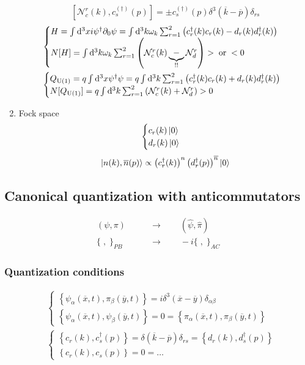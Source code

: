 \begin{example}
\begin{enumerate}
\[ \left[\mathcal{N}_c^{r}(k), c_s^{(\dagger)}(p)\right] = \pm c_s^{(\dagger)}(p)\delta^3(\overline{k}- \overline{p})\delta_{rs} \]
\begin{align*}
& \begin{cases}
H = \int \operatorname{d \!}{^3x}i\psi^\dagger\partial_0\psi = \int \operatorname{d \!}{^3k}\omega_k\sum^2_{r=1}\left(c^\dagger_r(k)c_r(k) - d_r(k)d_r^\dagger(k)\right) \\
N[H] = \int \operatorname{d \!}{^3k}\omega_k\sum^2_{r=1}\left(\mathcal{N}^r_c(k) \underbrace{-}_{!!}\mathcal{N}_d^{r}\right) > \;\text{or}\;< 0
\end{cases} \\
& \begin{cases}
Q_{\operatorname{U}(1)} = q\int \operatorname{d \!}{^3x}\psi^\dagger\psi = q\int \operatorname{d \!}{^3k}\sum^2_{r=1}\left(c^\dagger_r(k)c_r(k) + d_r(k)d_r^\dagger(k)\right) \\
N[Q_{\operatorname{U}(1)}] = q\int \operatorname{d \!}{^3k}\sum^2_{r=1}\left(\mathcal{N}^r_c(k) + \mathcal{N}_d^{r}\right) > 0
\end{cases}
\end{align*}
\item Fock space
\[ \begin{cases}
c_r(k)\left| 0 \right\rangle \\
d_r(k)\left| 0 \right\rangle
\end{cases} \]
\[ \left| n(k),\overline{n}(p) \right\rangle \propto \left(c_r^\dagger(k)\right)^n \left(d_r^\dagger(p)\right)^{\overline{n}}\left| 0 \right\rangle \]
\end{enumerate}
\end{example}

\subsection{Canonical quantization with anticommutators}
\begin{align*}
(\psi,\pi) & \qquad \to \qquad (\hat{\psi},\hat{\pi}) \\
\{\;,\;\}_{PB} & \qquad \to \qquad -i\{\;,\;\}_{AC}
\end{align*}
\subsubsection{Quantization conditions}
\begin{align*}
& \begin{cases}
\left\{\psi_\alpha(\overline{x},t),\pi_\beta(\overline{y},t)\right\} = i\delta^3(\overline{x}- \overline{y})\delta_{\alpha\beta} \\
\left\{\psi_\alpha(\overline{x},t), \psi_\beta(\overline{y},t)\right\} = 0 = \left\{\pi_\alpha(\overline{x},t), \pi_\beta(\overline{y},t)\right\}
\end{cases} \\
& \begin{cases}
\left\{c_r(k), c_s^\dagger(p)\right\} = \delta(\overline{k}- \overline{p})\delta_{rs} = \left\{d_r(k),d_s^\dagger(p)\right\} \\
\left\{c_r(k), c_s(p)\right\} = 0 = \ldots
\end{cases}
\end{align*}
